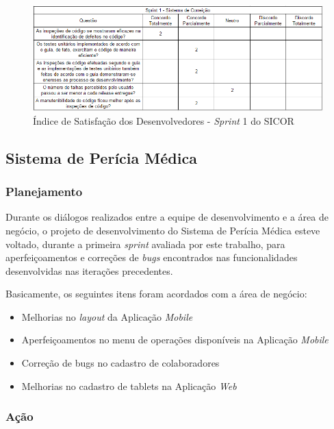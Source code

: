 \begin{figure}[h]
\includegraphics[width=\textwidth]{figuras/isd_sicor_1.png}
\caption{Índice de Satisfação dos Desenvolvedores - \textit{Sprint} 1 do SICOR}
\label{fig:satisfacaoSicor1}
\end{figure}

\clearpage

\subsection{Sistema de Perícia Médica}

\subsubsection{Planejamento}

Durante os diálogos realizados entre a equipe de desenvolvimento e a área de negócio, o projeto de desenvolvimento do Sistema de Perícia Médica esteve voltado, durante a primeira \textit{sprint} avaliada por este trabalho, para aperfeiçoamentos e correções de \textit{bugs} encontrados nas funcionalidades desenvolvidas nas iterações precedentes.

Basicamente, os seguintes itens foram acordados com a área de negócio:

\begin{itemize}
	\item Melhorias no \textit{layout} da Aplicação \textit{Mobile}
	\item Aperfeiçoamentos no menu de operações disponíveis na Aplicação \textit{Mobile}
	\item Correção de bugs no cadastro de colaboradores
	\item Melhorias no cadastro de tablets na Aplicação \textit{Web}
\end{itemize}

\subsubsection{Ação}

